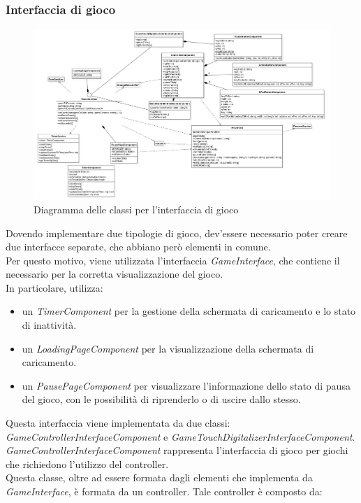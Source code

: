\subsubsection{Interfaccia di gioco}
\begin{figure}[h]
    \centering
    \includegraphics[width=340pt]{images/prog/GameInterface.png}
    \caption{Diagramma delle classi per l'interfaccia di gioco}
    \label{fig:gameinterface}
\end{figure}
Dovendo implementare due tipologie di gioco, dev'essere necessario poter creare due interfacce separate, che abbiano però elementi in comune.\\
Per questo motivo, viene utilizzata l'interfaccia \emph{GameInterface}, che contiene il necessario per la corretta visualizzazione del gioco.\\
In particolare, utilizza:
\begin{itemize}
    \item un \emph{TimerComponent} per la gestione della schermata di caricamento e lo stato di inattività.
    \item un \emph{LoadingPageComponent} per la visualizzazione della schermata di caricamento.
    \item un \emph{PausePageComponent} per visualizzare l'informazione dello stato di pausa del gioco, con le possibilità di riprenderlo o di uscire dallo stesso.
\end{itemize}
Questa interfaccia viene implementata da due classi: \emph{GameControllerInterfaceComponent} e \emph{GameTouchDigitalizerInterfaceComponent}.
\newpage
{}
\emph{GameControllerInterfaceComponent} rappresenta l'interfaccia di gioco per giochi che richiedono l'utilizzo del controller.\\
Questa classe, oltre ad essere formata dagli elementi che implementa da \emph{GameInterface}, è formata da un controller. Tale controller è composto da:
